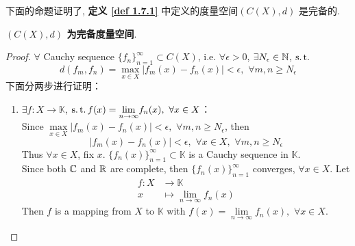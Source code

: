 	\newpage
	
	下面的命题证明了, \textbf{定义 \ref{def 1.7.1}} 中定义的度量空间$(C(X) , d)$ 是完备的.
	
	\begin{proposition}\label{prop 1.7.1}
		\textbf{$(C(X) , d)$ 为完备度量空间}.
		
		\vspace{2em}
		
		\begin{proof}
			$\forall$ Cauchy sequence $\{ f_n \}_{n = 1}^{\infty} \subset C(X)$, i.e. $\forall \epsilon > 0$, $\exists N_\epsilon \in \mathbb{N}$, $\operatorname{s.t.}$
			\[ d(f_m , f_n) = \max_{x \in X} \left| f_{m}(x) - f_{n}(x) \right| < \epsilon , \,\, \forall m , n \geq N_\epsilon \]
			下面分两步进行证明：
			\begin{enumerate}
				\item $\exists f : X \longrightarrow \mathbb{K}$, $\operatorname{s.t.} f(x) = \underset{n \to \infty}{\lim} f_{n}(x) , \,\, \forall x \in X$：\\
				Since $\underset{x \in X}{\max} \left| f_{m}(x) - f_{n}(x) \right| < \epsilon , \,\, \forall m , n \geq N_\epsilon$, then 
				\[ \left| f_{m}(x) - f_{n}(x) \right| < \epsilon , \,\, \forall x \in X , \,\, \forall m , n \geq N_\epsilon \]
				Thus $\forall x \in X$, fix $x$. $\{ f_{n}(x) \}_{n = 1}^{\infty} \subset \mathbb{K}$ is a Cauchy sequence in $\mathbb{K}$. \\
				Since both $\mathbb{C}$ and $\mathbb{R}$ are complete, then $\{ f_{n}(x) \}_{n = 1}^{\infty}$ converges, $\forall x \in X$. Let
				\begin{align}
					f : X &\longrightarrow \mathbb{K} \\
					x &\longmapsto \lim_{n \to \infty} f_{n}(x)
				\end{align}
				Then $f$ is a mapping from $X$ to $\mathbb{K}$ with $f(x) = \underset{n \to \infty}{\lim} f_{n}(x) , \,\, \forall x \in X$.
				
				\vspace{4em}
				

\end{enumerate}
\end{proof}
\end{proposition}
